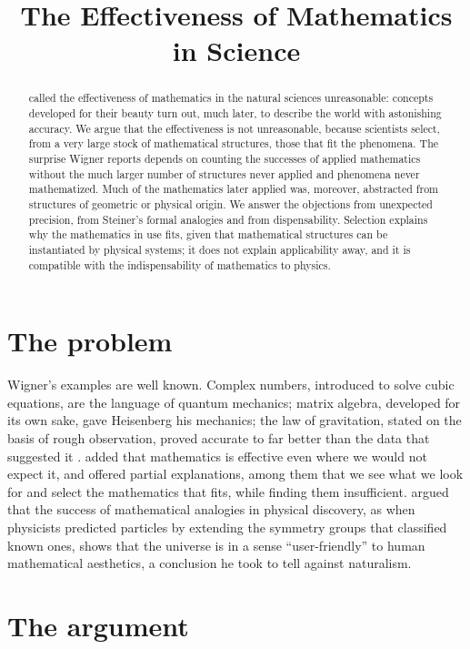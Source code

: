 \documentclass{situationist-preprint}
\title{The Effectiveness of Mathematics in Science}
\begin{document}
\maketitle

\begin{abstract}
\citet{Wigner1960} called the effectiveness of mathematics in the natural sciences unreasonable: concepts developed for their beauty turn out, much later, to describe the world with astonishing accuracy. We argue that the effectiveness is not unreasonable, because scientists select, from a very large stock of mathematical structures, those that fit the phenomena. The surprise Wigner reports depends on counting the successes of applied mathematics without the much larger number of structures never applied and phenomena never mathematized. Much of the mathematics later applied was, moreover, abstracted from structures of geometric or physical origin. We answer the objections from unexpected precision, from Steiner's formal analogies and from dispensability. Selection explains why the mathematics in use fits, given that mathematical structures can be instantiated by physical systems; it does not explain applicability away, and it is compatible with the indispensability of mathematics to physics.
\end{abstract}

\section{The problem}

Wigner's examples are well known. Complex numbers, introduced to solve cubic equations, are the language of quantum mechanics; matrix algebra, developed for its own sake, gave Heisenberg his mechanics; the law of gravitation, stated on the basis of rough observation, proved accurate to far better than the data that suggested it \citep{Wigner1960}. \citet{Hamming1980} added that mathematics is effective even where we would not expect it, and offered partial explanations, among them that we see what we look for and select the mathematics that fits, while finding them insufficient. \citet{Steiner1998} argued that the success of mathematical analogies in physical discovery, as when physicists predicted particles by extending the symmetry groups that classified known ones, shows that the universe is in a sense \enquote{user-friendly} to human mathematical aesthetics, a conclusion he took to tell against naturalism.

\section{The argument}
\end{document}
